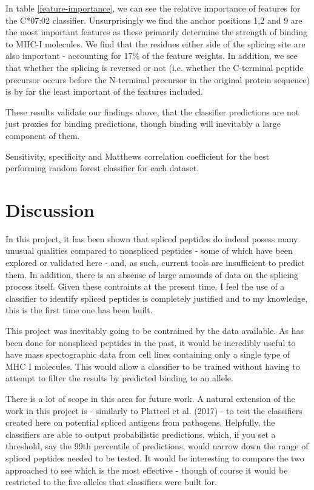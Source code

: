 \documentclass[10pt,a4paper,twoside,twocolumn]{article}
\begin{document}
In table \ref{feature-importance}, we can see the relative importance of features for the C*07:02 classifier. Unsurprisingly we find the anchor positions 1,2 and 9 are the most important features as these primarily determine the strength of binding to MHC-I molecules. We find that the residues either side of the splicing site are also important - accounting for 17\% of the feature weights. In addition, we see that whether the splicing is reversed or not (i.e.  whether the C-terminal peptide precursor occurs before the N-terminal precursor in the original protein sequence) is by far the least important of the features included.

These results validate our findings above, that the classifier predictions are not just proxies for binding predictions, though binding will inevitably a large component of them.

\begin{table}
	\centering
	
	\caption{Sensitivity, specificity and Matthews correlation coefficient for the best performing random forest classifier for each dataset.}
	\label{sensitivity-specificity}
\end{table}


\section*{Discussion}

In this project, it has been shown that spliced peptides do indeed posess many unusual qualities compared to nonspliced peptides - some of which have been explored or validated here - and, as such, current tools are insufficient to predict them. In addition, there is an absense of large amounds of data on the splicing process itself. Given these contraints at the present time, I feel the use of a classifier to identify spliced peptides is completely justified and to my knowledge, this is the first time one has been built.

This project was inevitably going to be contrained by the data available. As has been done for nonspliced peptides in the past, it would be incredibly useful to have mass spectographic data from cell lines containing only a single type of MHC I molecules. This would allow a classifier to be trained without having to attempt to filter the results by predicted binding to an allele.

There is a lot of scope in this area for future work. A natural extension of the work in this project is - similarly to Platteel et al. (2017)  - to test the classifiers created here on potential spliced antigens from pathogens. Helpfully, the classifiers are able to output probabilistic predictions, which, if you set a threshold, say the 99th percentile of predictions, would narrow down the range of spliced peptides needed to be tested. It would be interesting to compare the two approached to see which is the most effective - though of course it would be restricted to the five alleles that classifiers were built for.
\end{document}
